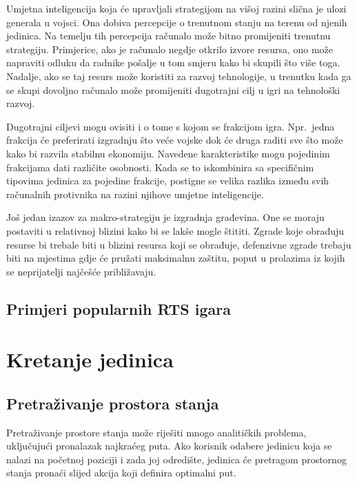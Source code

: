 \documentclass[times, utf8, zavrsni, numeric]{fer}
\begin{document}

\par Umjetna inteligencija koja će upravljali strategijom na višoj razini slična je ulozi generala u vojsci. 
Ona dobiva percepcije o trenutnom stanju na terenu od njenih jedinica.
Na temelju tih percepcija računalo može bitno promijeniti trenutnu strategiju. Primjerice, ako je računalo negdje otkrilo izvore resursa, ono može napraviti odluku da radnike pošalje u tom smjeru kako bi skupili što više toga.
Nadalje, ako se taj resurs može koristiti za razvoj tehnologije, u trenutku kada ga se skupi dovoljno računalo može promijeniti dugotrajni cilj u igri na tehnološki razvoj.

\par Dugotrajni ciljevi mogu ovisiti i o tome s kojom se frakcijom igra. 
Npr.\ jedna frakcija će preferirati izgradnju što veće vojske dok će druga raditi sve što može kako bi razvila stabilnu ekonomiju.
Navedene karakteristike mogu pojedinim frakcijama dati različite osobnosti.
Kada se to iskombinira sa specifičnim tipovima jedinica za pojedine frakcije, postigne se velika razlika između svih računalnih protivnika na razini njihove umjetne inteligencije.

\par Još jedan izazov za makro-strategiju je izgradnja građevina.
One se moraju postaviti u relativnoj blizini kako bi se lakše mogle štititi.
Zgrade koje obrađuju resurse bi trebale biti u blizini resursa koji se obrađuje, defenzivne zgrade trebaju biti na mjestima gdje će pružati maksimalnu zaštitu, poput u prolazima iz kojih se neprijatelji najčešće približavaju.
\section{Primjeri popularnih RTS igara}

\chapter{Kretanje jedinica}\label{ch:pathfinding}

\section{Pretraživanje prostora stanja}\label{sec:stateSearch}
\par Pretraživanje prostore stanja može riješiti mnogo analitičkih problema, uključujući pronalazak najkraćeg puta. 
Ako korisnik odabere jedinicu koja se nalazi na početnoj poziciji i zada joj odredište, jedinica će pretragom prostornog stanja pronaći slijed akcija koji definira optimalni put.
\end{document}

